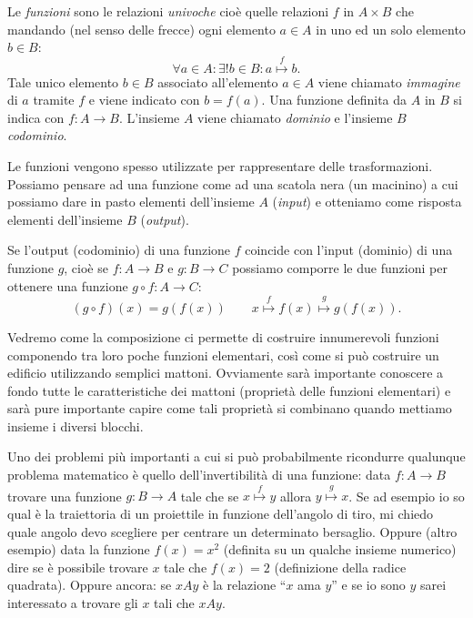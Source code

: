 \documentclass[italian,a4paper,hidelinks,headinclude]{scrartcl}
\newcommand{\myemph}[1]{\emph{#1}\marginpar{#1}}
\begin{document}
Le \myemph{funzioni} sono le relazioni \emph{univoche} cioè quelle relazioni $f$ in
$A\times B$ che
mandando (nel senso delle frecce) ogni elemento $a\in A$ in uno
ed un solo elemento
$b\in B$:
\[
\forall a\in A\colon \exists ! b\in B\colon a\stackrel{f}\mapsto b.
\]
Tale unico elemento $b\in B$ associato all'elemento $a\in A$ viene chiamato
\emph{immagine} di $a$ tramite $f$ e viene indicato con $b=f(a)$.
Una funzione definita da $A$ in $B$ si indica con $f\colon A \to B$. L'insieme
$A$ viene chiamato \myemph{dominio} e l'insieme $B$ \myemph{codominio}.

Le funzioni vengono spesso utilizzate per rappresentare delle trasformazioni.
Possiamo pensare ad una funzione come ad una scatola nera (un macinino)
a cui possiamo dare in pasto elementi dell'insieme $A$ (\emph{input})
e otteniamo come risposta elementi dell'insieme $B$ (\emph{output}).

Se l'output (codominio) di una funzione $f$
coincide con l'input (dominio) di una funzione $g$,
cioè se $f\colon A \to B$ e $g\colon B \to C$
possiamo comporre
le due funzioni per ottenere una funzione
$g\circ f \colon A \to C$:
\[
(g\circ f)(x) = g(f(x))\qquad
x \stackrel f \mapsto f(x) \stackrel g \mapsto g(f(x)).
\]

Vedremo come la composizione ci permette di costruire innumerevoli funzioni
componendo tra loro poche funzioni elementari, così come si può costruire un edificio
utilizzando semplici mattoni.
Ovviamente sarà importante conoscere a fondo
tutte le caratteristiche dei mattoni (proprietà delle funzioni elementari)
e sarà pure importante capire come tali proprietà si combinano quando mettiamo
insieme i diversi blocchi.

Uno dei problemi più importanti a
cui si può probabilmente ricondurre qualunque problema
matematico è quello dell'invertibilità di una funzione: data $f\colon A\to B$
trovare una funzione $g\colon B\to A$ tale che
se $x\stackrel f \mapsto y$ allora
$y \stackrel g\mapsto x$. Se ad esempio io so qual è la traiettoria di
un proiettile in funzione dell'angolo di tiro, mi chiedo quale angolo devo
scegliere per centrare un determinato bersaglio.
Oppure (altro esempio) data la funzione $f(x) = x^2$ (definita su un qualche insieme
numerico) dire se è possibile trovare $x$ tale che $f(x) = 2$
(definizione della radice quadrata).
Oppure ancora: se $x A y$ è la relazione ``$x$ ama $y$''
e se io sono $y$ sarei interessato a trovare gli $x$ tali che $x A y$.
\end{document}
